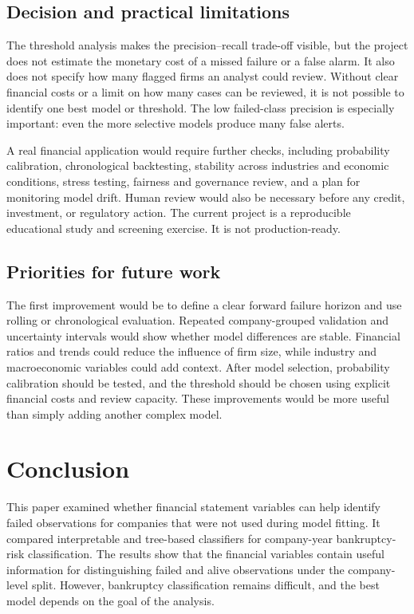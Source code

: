 \documentclass[11pt,a4paper]{article}
\begin{document}
\subsection{Decision and practical limitations}

The threshold analysis makes the precision--recall trade-off visible, but the
project does not estimate the monetary cost of a missed failure or a false
alarm. It also does not specify how many flagged firms an analyst could review.
Without clear financial costs or a limit on how many cases can be reviewed, it
is not possible to identify one best model or threshold. The low failed-class precision is especially
important: even the more selective models produce many false alerts.

A real financial application would require further checks, including
probability calibration, chronological backtesting, stability across industries
and economic conditions, stress testing, fairness and governance review, and a
plan for monitoring model drift. Human review would also be necessary before any
credit, investment, or regulatory action. The current project is a reproducible
educational study and screening exercise. It is not production-ready.

\subsection{Priorities for future work}

The first improvement would be to define a clear forward failure horizon and
use rolling or chronological evaluation. Repeated company-grouped validation
and uncertainty intervals would show whether model differences are stable.
Financial ratios and trends could reduce the influence of firm size, while
industry and macroeconomic variables could add context. After model selection,
probability calibration should be tested, and the threshold should be chosen
using explicit financial costs and review capacity. These improvements would be
more useful than simply adding another complex model.

\section{Conclusion}
\label{sec:conclusion}

This paper examined whether financial statement variables can help identify
failed observations for companies that were not used during model fitting. It
compared interpretable and tree-based classifiers for company-year
bankruptcy-risk classification. The results show that the financial variables
contain useful information for distinguishing failed and alive observations
under the company-level split. However, bankruptcy classification remains
difficult, and the best model depends on the goal of the analysis.
\end{document}
